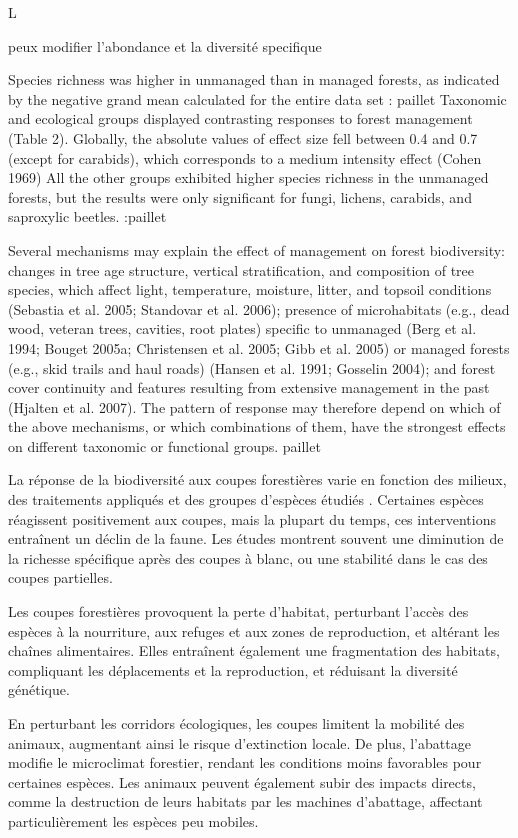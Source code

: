 L

peux modifier l'abondance et la diversité specifique

Species richness was higher in unmanaged than in managed forests, as indicated by the negative grand mean calculated for the entire data set : paillet
Taxonomic and ecological groups displayed contrasting responses to forest management (Table 2). Globally, the absolute values of effect size fell between 0.4 and 0.7 (except for carabids), which corresponds to a medium intensity effect (Cohen 1969)
All the other groups exhibited higher species richness in the unmanaged forests, but the results were only significant for fungi, lichens, carabids, and saproxylic beetles. :paillet

Several mechanisms may explain the effect of management on forest biodiversity: changes in tree age structure, vertical stratification, and composition of tree species, which affect light, temperature, moisture, litter, and topsoil conditions (Sebastia et al. 2005; Standovar et al. 2006); presence of microhabitats (e.g., dead wood, veteran trees, cavities, root plates) specific to unmanaged (Berg et al. 1994; Bouget 2005a; Christensen et al. 2005; Gibb et al. 2005) or managed forests (e.g., skid trails and haul roads) (Hansen et al. 1991; Gosselin 2004); and forest cover continuity and features resulting from extensive management in the past (Hjalten et al. 2007). The pattern of response may therefore depend on which of the above mechanisms, or which combinations of them, have the strongest effects on different taxonomic or functional groups. paillet


La réponse de la biodiversité aux coupes forestières varie en fonction des milieux, des traitements appliqués et des groupes d'espèces étudiés \citep{Kudrin2023metaanalysiseffects}.
Certaines espèces réagissent positivement aux coupes, mais la plupart du temps, ces interventions entraînent un déclin de la faune. 
Les études montrent souvent une diminution de la richesse spécifique après des coupes à blanc, ou une stabilité dans le cas des coupes partielles.

Les coupes forestières provoquent la perte d'habitat, perturbant l'accès des espèces à la nourriture, aux refuges et aux zones de reproduction, et altérant les chaînes alimentaires. 
Elles entraînent également une fragmentation des habitats, compliquant les déplacements et la reproduction, et réduisant la diversité génétique.

En perturbant les corridors écologiques, les coupes limitent la mobilité des animaux, augmentant ainsi le risque d'extinction locale. 
De plus, l'abattage modifie le microclimat forestier, rendant les conditions moins favorables pour certaines espèces. 
Les animaux peuvent également subir des impacts directs, comme la destruction de leurs habitats par les machines d'abattage, affectant particulièrement les espèces peu mobiles.

